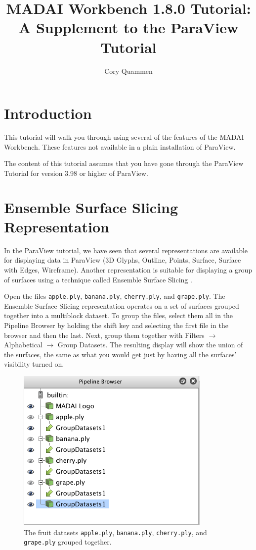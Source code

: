 \documentclass[12pt]{article}
\title{MADAI Workbench 1.8.0 Tutorial: \\A Supplement to the ParaView Tutorial}
\author{Cory Quammen}
\date{} %
\begin{document}
\maketitle
\tableofcontents

\section{Introduction}

This tutorial will walk you through using several of the features of the MADAI Workbench. These features not available in a plain installation of ParaView.

The content of this tutorial assumes that you have gone through the ParaView Tutorial for version 3.98 or higher of ParaView.

\section{Ensemble Surface Slicing Representation}

In the ParaView tutorial, we have seen that several representations are available for displaying data in ParaView (3D Glyphs, Outline, Points, Surface, Surface with Edges, Wireframe). Another representation is suitable for displaying a group of surfaces using a technique called Ensemble Surface Slicing \cite{Oluwafemi2012}.

Open the files \texttt{apple.ply}, \texttt{banana.ply}, \texttt{cherry.ply}, and \texttt{grape.ply}. The Ensemble Surface Slicing representation operates on a set of surfaces grouped together into a multiblock dataset. To group the files, select them all in the Pipeline Browser by holding the shift key and selecting the first file in the browser and then the last. Next, group them together with Filters $\rightarrow$ Alphabetical $\rightarrow$ Group Datasets. The resulting display will show the union of the surfaces, the same as what you would get just by having all the surfaces' visibility turned on.

\begin{figure}[htbp]
   \centering
   \includegraphics[scale=.5]{images/ESSGroupDatasets.png} %
   \caption{The fruit datasets \texttt{apple.ply}, \texttt{banana.ply}, \texttt{cherry.ply}, and \texttt{grape.ply} grouped together.}
   \label{fig:ESSGroupDatasets}
\end{figure}
\end{document}
